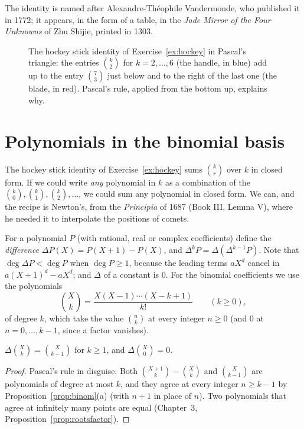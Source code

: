 The identity is named after Alexandre-Th\'eophile Vandermonde, who published it in 1772; it appears, in the form of a table, in the \emph{Jade Mirror of
the Four Unknowns} of Zhu Shijie, printed in 1303.

\begin{figure}[ht]
\centering
{}
\caption{The hockey stick identity of Exercise~\ref{ex:hockey} in Pascal's triangle: the entries $\binom k2$ for $k=2,\dots,6$ (the handle, in blue) add up to the entry $\binom73$ just below and to the right of the last one (the blade, in red). Pascal's rule, applied from the bottom up, explains why.}
\label{fig:hockey}
\end{figure}

\section{Polynomials in the binomial basis}

The hockey stick identity of Exercise~\ref{ex:hockey} sums $\binom kr$ over $k$ in closed form. If we could write \emph{any} polynomial in $k$ as a
combination of the $\binom k0,\binom k1,\binom k2,\dots$, we could sum any polynomial in closed form. We can, and the recipe is Newton's, from the
\emph{Principia} of 1687 (Book III, Lemma V), where he needed it to interpolate the positions of comets.

For a polynomial $P$ (with rational, real or complex coefficients) define the \emph{difference} $\Delta P(X)=P(X+1)-P(X)$, and $\Delta^kP=\Delta(\Delta^{k-1}P)$.
Note that $\deg\Delta P<\deg P$ when $\deg P\ge1$, because the leading terms $aX^d$ cancel in $a(X+1)^d-aX^d$; and $\Delta$ of a constant is $0$.
For the binomial coefficients we use the polynomials
\[
\binom Xk=\frac{X(X-1)\cdots(X-k+1)}{k!}\qquad(k\ge0),
\]
of degree $k$, which take the value $\binom nk$ at every integer $n\ge0$ (and $0$ at $n=0,\dots,k-1$, since a factor vanishes).

\begin{proposition}\label{prop:deltabinom}
$\Delta\binom Xk=\binom X{k-1}$ for $k\ge1$, and $\Delta\binom X0=0$.
\end{proposition}
\begin{proof}
Pascal's rule in disguise. Both $\binom{X+1}k-\binom Xk$ and $\binom X{k-1}$ are polynomials of degree at most $k$, and they agree at every integer
$n\ge k-1$ by Proposition~\ref{prop:binom}(a) (with $n+1$ in place of $n$). Two polynomials that agree at infinitely many points are equal
(Chapter~3, Proposition~\ref{prop:rootsfactor}).
\end{proof}

